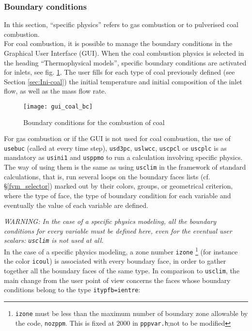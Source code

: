 {{{%
\subsubsection{Boundary conditions}\label{sec:coal-cl}
In this section, ``specific physics'' refers to gas combustion or
to pulverised coal combustion.\\
For coal combustion, it is possible to manage the boundary conditions in the Graphical User Interface (GUI). When the coal combustion physics is selected in the heading ``Thermophysical models'', specific boundary conditions are activated for inlets, see fig. \ref{fig:cond_lim-coal}. The user fills for each type of coal previously defined (see Section \ref{sec:Ini-coal}) the initial temperature and initial composition of the inlet flow, as well as the mass flow rate.

\begin{figure}[!ht]
\begin{center}
\texttt{[image: gui\_coal\_bc]}
\caption{Boundary conditions for the combustion of coal}
\label{fig:cond_lim-coal}
\end{center}
\end{figure}

For gas combustion or if the GUI is not used for coal combustion, the use of \texttt{usebuc} (called at every time step),
\texttt {usd3pc}, \texttt{uslwcc}, \texttt{uscpcl} or \texttt{uscplc} is as
mandatory as \texttt{usini1} and \texttt{usppmo} to run a calculation involving specific physics. The way of using them is the same as using
\texttt{usclim} in the framework of standard calculations, that is, run several loops on the boundary faces lists (cf. \S\ref{fvm_selector})
marked out by their colors, groups, or  geometrical criterion, where
the type of face, the type of boundary condition for each variable and
eventually the value of each variable are defined.

{\em WARNING: In the case of a specific physics modeling, all the
boundary conditions for every variable must be defined here, even for
the eventual user scalars: {\em \texttt{usclim}} is not used at all.}\\

In the case of a specific physics modeling, a zone number \texttt{izone}
\footnote{\texttt{izone} must be less than the maximum number of boundary
zone allowable by the code, \texttt{nozppm}. This is fixed at 2000 in
 \texttt{pppvar.h};not to be modified} (for
instance the color \texttt{icoul}) is associated with every boundary face, in
order to gather together all the boundary faces of the same type. In
comparison to \texttt{usclim}, the main change from the user point of
view concerns the faces whose boundary conditions belong to the type
\texttt{itypfb=ientre}:

}}}
